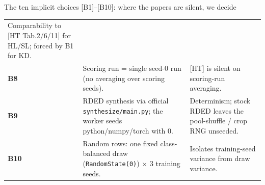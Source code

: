 \documentclass[aspectratio=169]{beamer}
\begin{document}
\begin{frame}{The ten implicit choices [B1]--[B10]: where the papers are silent, we decide}
\begin{center}
{\begin{tabular}{@{}l p{8.4cm} p{5.6cm}@{}}
        Comparability to [HT Tab.2/6/11] for HL/SL; forced by B1 for KD. \\
    \textbf{B8} & Scoring run = single seed-0 run (no averaging over scoring seeds). &
        [HT] is silent on scoring-run averaging. \\
    \textbf{B9} & RDED synthesis via official \texttt{synthesize/main.py}; the worker seeds
        python/numpy/torch with 0. &
        Determinism; stock RDED leaves the pool-shuffle / crop RNG unseeded. \\
    \textbf{B10} & Random rows: one fixed class-balanced draw (\texttt{RandomState(0)}) $\times$ 3 training seeds. &
        Isolates training-seed variance from draw variance. \\
    \bottomrule
    \end{tabular}}
    \end{center}

\end{frame}
\end{document}
